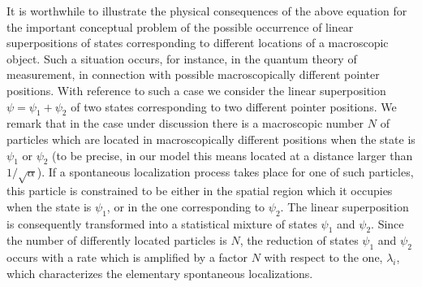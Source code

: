 \documentclass[10pt,a4paper]{article}
\begin{document}
It is worthwhile to illustrate the physical consequences of the
above equation for the important conceptual problem of the
possible occurrence of linear superpositions of states
corresponding to different locations of a macroscopic object. Such
a situation occurs, for instance, in the quantum theory of
measurement, in connection with possible macroscopically different
pointer positions. With reference to such a case we consider the
linear superposition $\psi = \psi_{1} + \psi_{2}$ of two states
corresponding to two different pointer positions. We remark that
in the case under discussion there is a macroscopic number $N$  of
particles which are located in macroscopically different positions
when the state is $\psi_{1}$ or $\psi_{2}$ (to be precise, in our
model this means located at a distance larger than
$1/\sqrt{\alpha}$). If a spontaneous localization process takes
place for one of such particles, this particle is constrained to
be either in the spatial region which it occupies when the state
is $\psi_{1}$, or in the one corresponding to $\psi_{2}$. The
linear superposition is consequently transformed into a
statistical mixture of states $\psi_{1}$ and $\psi_{2}$. Since the
number of differently located particles is $N$, the reduction of
states $\psi_{1}$ and $\psi_{2}$ occurs with a rate which is
amplified by a factor $N$ with respect to the one, $\lambda_{i}$,
which characterizes the elementary spontaneous localizations.
\end{document}
